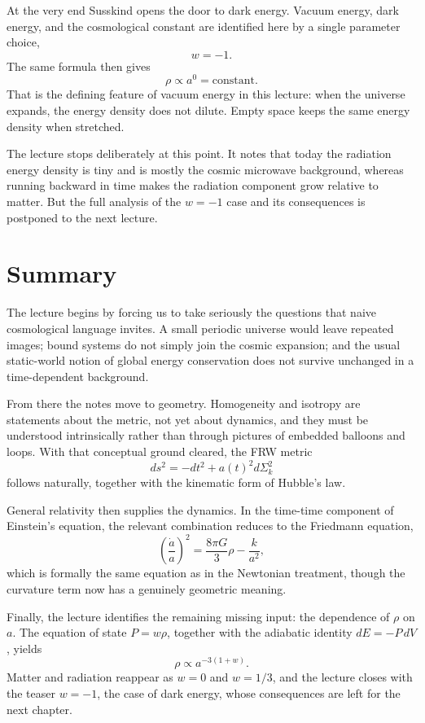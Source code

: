 At the very end Susskind opens the door to dark energy. Vacuum energy, dark energy, and the cosmological constant are identified here by a single parameter choice,
\begin{equation}
w=-1 .
\end{equation}
The same formula then gives
\begin{equation}
\rho \propto a^{0} = \text{constant}.
\end{equation}
That is the defining feature of vacuum energy in this lecture: when the universe expands, the energy density does not dilute. Empty space keeps the same energy density when stretched.

The lecture stops deliberately at this point. It notes that today the radiation energy density is tiny and is mostly the cosmic microwave background, whereas running backward in time makes the radiation component grow relative to matter. But the full analysis of the \(w=-1\) case and its consequences is postponed to the next lecture.

\section{Summary}

The lecture begins by forcing us to take seriously the questions that naive cosmological language invites. A small periodic universe would leave repeated images; bound systems do not simply join the cosmic expansion; and the usual static-world notion of global energy conservation does not survive unchanged in a time-dependent background.

From there the notes move to geometry. Homogeneity and isotropy are statements about the metric, not yet about dynamics, and they must be understood intrinsically rather than through pictures of embedded balloons and loops. With that conceptual ground cleared, the FRW metric
\[
ds^2=-dt^2+a(t)^2 d\Sigma_k^2
\]
follows naturally, together with the kinematic form of Hubble's law.

General relativity then supplies the dynamics. In the time-time component of Einstein's equation, the relevant combination reduces to the Friedmann equation,
\[
\left(\frac{\dot a}{a}\right)^2 = \frac{8\pi G}{3}\rho - \frac{k}{a^2},
\]
which is formally the same equation as in the Newtonian treatment, though the curvature term now has a genuinely geometric meaning.

Finally, the lecture identifies the remaining missing input: the dependence of \(\rho\) on \(a\). The equation of state \(P=w\rho\), together with the adiabatic identity \(dE=-P\,dV\), yields
\[
\rho \propto a^{-3(1+w)}.
\]
Matter and radiation reappear as \(w=0\) and \(w=1/3\), and the lecture closes with the teaser \(w=-1\), the case of dark energy, whose consequences are left for the next chapter.